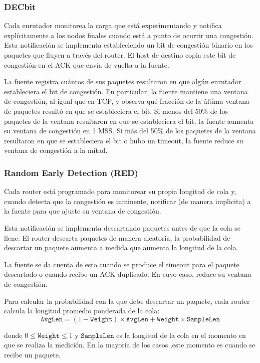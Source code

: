 \subsubsection*{DECbit}
Cada enrutador monitorea la carga que está experimentando y notifica explícitamente a los nodos finales cuando está a punto de ocurrir una congestión. Esta notificación se implementa estableciendo un bit de congestión binario en los paquetes que fluyen a través del router. El host de destino copia este bit de congestión en el ACK que envía de vuelta a la fuente.

La fuente registra cuántos de sus paquetes resultaron en que algún enrutador estableciera el bit de congestión. En particular, la fuente mantiene una ventana de congestión, al igual que en TCP, y observa qué fracción de la última ventana de paquetes resultó en que se estableciera el bit. Si menos del 50\% de los paquetes de la ventana resultaron en que se estableciera el bit, la fuente aumenta su ventana de congestión en 1 MSS. Si más del 50\% de los paquetes de la ventana resultaron en que se estableciera el bit o hubo un timeout, la fuente reduce su ventana de congestión a la mitad.

\subsubsection*{Random Early Detection (RED)}
Cada router está programado para monitorear su propia longitud de cola y, cuando detecta que la congestión es inminente, notificar (de manera implicita) a la fuente para que ajuste su ventana de congestión.

Esta notificación se implementa descartando paquetes antes de que la cola se llene. El router descarta paquetes de manera aleatoria, la probabilidad de descartar un paquete aumenta a medida que aumenta la longitud de la cola.

La fuente se da cuenta de esto cuando se produce el timeout para el paquete descartado o cuando recibe un ACK duplicado. En cuyo caso, reduce su ventana de congestión.

Para calcular la probabilidad con la que debe descartar un paquete, cada router calcula la longitud promedio ponderada de la cola:
\[
    \texttt{AvgLen} = (1 - \texttt{Weight}) \times \texttt{AvgLen} + \texttt{Weight} \times \texttt{SampleLen}
\]

donde \(0\leq \texttt{Weight} \leq 1\) y \(\texttt{SampleLen}\) es la longitud de la cola en el momento en que se realiza la medición. En la mayoría de los casos ,este momento es cuando se recibe un paquete.

